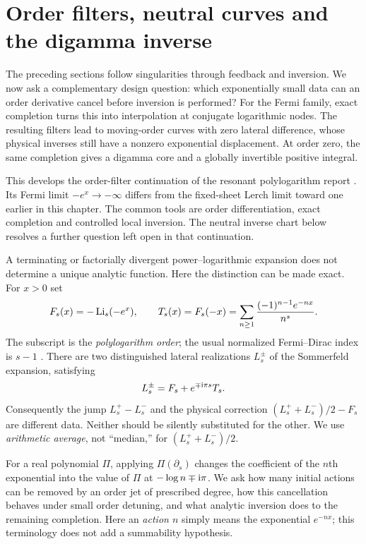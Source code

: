 \section{Order filters, neutral curves and the digamma inverse}
\label{ojf:section}

The preceding sections follow singularities through feedback and inversion.
We now ask a complementary design question: which exponentially small data
can an order derivative cancel before inversion is performed? For the
Fermi family, exact completion turns this into interpolation at conjugate
logarithmic nodes. The resulting filters lead to moving-order curves with
zero lateral difference, whose physical inverses still have a nonzero
exponential displacement. At order zero, the same completion gives a
digamma core and a globally invertible positive integral.

This develops the order-filter continuation \cite{ojf:report} of the
resonant polylogarithm report \cite{qfb:reports}. Its Fermi limit
$-e^x\to-\infty$ differs from the fixed-sheet Lerch limit toward one
earlier in this chapter. The common tools are order differentiation,
exact completion and controlled local inversion. The neutral inverse
chart below resolves a further question left open in that continuation.

A terminating or factorially divergent power--logarithmic expansion does
not determine a unique analytic function. Here the distinction
can be made exact. For $x>0$ set
\begin{equation}\label{ojf:eq:defs}
 F_s(x)=-\operatorname{Li}_s(-e^x),\qquad
 T_s(x)=F_s(-x)=\sum_{n\ge1}\frac{(-1)^{n-1}e^{-nx}}{n^s}.
\end{equation}
The subscript is the \emph{polylogarithm order}; the usual normalized
Fermi--Dirac index is $s-1$ \cite{rw:DLMFPolylog}.
There are two distinguished lateral realizations $L_s^\pm$ of the
Sommerfeld expansion, satisfying
\begin{equation}\label{ojf:eq:intro-completion}
 L_s^\pm=F_s+e^{\mp\mathrm{i}\pi s}T_s.
\end{equation}
Consequently the jump $L_s^+-L_s^-$ and the physical correction
$(L_s^++L_s^-)/2-F_s$ are different data. Neither should be silently
substituted for the other. We use \emph{arithmetic average}, not
``median,'' for $(L_s^++L_s^-)/2$.

For a real polynomial $\Pi$, applying $\Pi(\partial_s)$ changes the
coefficient of the $n$th exponential into the value of $\Pi$ at
$-\log n\mp\mathrm{i}\pi$. We ask how many initial actions can be removed by
an order jet of prescribed degree, how this cancellation behaves under
small order detuning, and what analytic inversion does to the remaining
completion. Here an \emph{action $n$} simply means the exponential
$e^{-nx}$; this terminology does not add a summability hypothesis.


